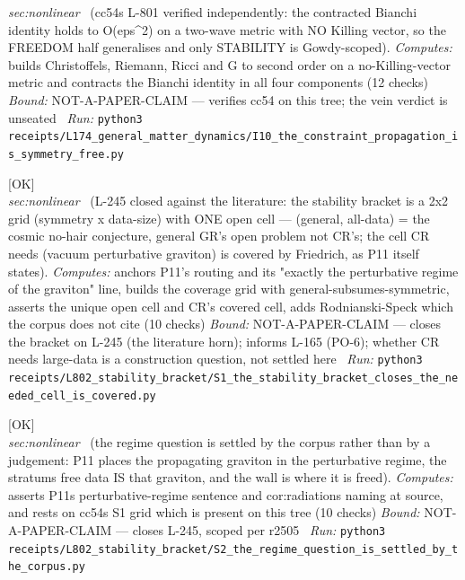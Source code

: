 \begin{description}
\textit{sec:nonlinear} \ (cc54s L-801 verified independently: the contracted Bianchi identity holds to O(eps\textasciicircum{}2) on a two-wave metric with NO Killing vector, so the FREEDOM half generalises and only STABILITY is Gowdy-scoped). 
\emph{Computes:} builds Christoffels, Riemann, Ricci and G to second order on a no-Killing-vector metric and contracts the Bianchi identity in all four components (12 checks)
 \emph{Bound:} NOT-A-PAPER-CLAIM --- verifies cc54 on this tree; the vein verdict is unseated
\ \emph{Run:} \texttt{python3 receipts/L174\_general\_matter\_dynamics/I10\_the\_constraint\_propagation\_is\_symmetry\_free.py}
\item[\label{rcpt:S1_the_stability_bracket_closes_the_needed_cell_is_covered}\textbf{}\quad\texttt{S1\_the\_stability\_bracket\_closes\_the\_needed\_cell\_is\_covered}]\hfill\textsf{[OK]}\\
\textit{sec:nonlinear} \ (L-245 closed against the literature: the stability bracket is a 2x2 grid (symmetry x data-size) with ONE open cell --- (general, all-data) = the cosmic no-hair conjecture, general GR's open problem not CR's; the cell CR needs (vacuum perturbative graviton) is covered by Friedrich, as P11 itself states). 
\emph{Computes:} anchors P11's routing and its "exactly the perturbative regime of the graviton" line, builds the coverage grid with general-subsumes-symmetric, asserts the unique open cell and CR's covered cell, adds Rodnianski-Speck which the corpus does not cite (10 checks)
 \emph{Bound:} NOT-A-PAPER-CLAIM --- closes the bracket on L-245 (the literature horn); informs L-165 (PO-6); whether CR needs large-data is a construction question, not settled here
\ \emph{Run:} \texttt{python3 receipts/L802\_stability\_bracket/S1\_the\_stability\_bracket\_closes\_the\_needed\_cell\_is\_covered.py}
\item[\label{rcpt:S2_the_regime_question_is_settled_by_the_corpus}\textbf{}\quad\texttt{S2\_the\_regime\_question\_is\_settled\_by\_the\_corpus}]\hfill\textsf{[OK]}\\
\textit{sec:nonlinear} \ (the regime question is settled by the corpus rather than by a judgement: P11 places the propagating graviton in the perturbative regime, the stratums free data IS that graviton, and the wall is where it is freed). 
\emph{Computes:} asserts P11s perturbative-regime sentence and cor:radiations naming at source, and rests on cc54s S1 grid which is present on this tree (10 checks)
 \emph{Bound:} NOT-A-PAPER-CLAIM --- closes L-245, scoped per r2505
\ \emph{Run:} \texttt{python3 receipts/L802\_stability\_bracket/S2\_the\_regime\_question\_is\_settled\_by\_the\_corpus.py}

\end{description}

